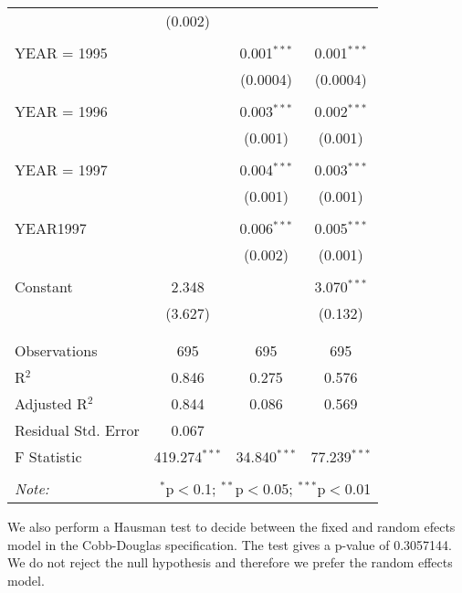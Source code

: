 \documentclass[12pt,a4paper]{article}\usepackage[]{graphicx}\usepackage[]{color}
\begin{document}
\begin{table}[!htbp]
\begin{tabular}{@{\extracolsep{5pt}}lccc}
  & (0.002) &  &  \\ 
  & & & \\ 
 YEAR = 1995 &  & 0.001$^{***}$ & 0.001$^{***}$ \\ 
  &  & (0.0004) & (0.0004) \\ 
  & & & \\ 
 YEAR = 1996 &  & 0.003$^{***}$ & 0.002$^{***}$ \\ 
  &  & (0.001) & (0.001) \\ 
  & & & \\ 
 YEAR = 1997 &  & 0.004$^{***}$ & 0.003$^{***}$ \\ 
  &  & (0.001) & (0.001) \\ 
  & & & \\ 
 YEAR1997 &  & 0.006$^{***}$ & 0.005$^{***}$ \\ 
  &  & (0.002) & (0.001) \\ 
  & & & \\ 
 Constant & 2.348 &  & 3.070$^{***}$ \\ 
  & (3.627) &  & (0.132) \\ 
  & & & \\ 
\hline \\[-1.8ex] 
Observations & 695 & 695 & 695 \\ 
R$^{2}$ & 0.846 & 0.275 & 0.576 \\ 
Adjusted R$^{2}$ & 0.844 & 0.086 & 0.569 \\ 
Residual Std. Error & 0.067 &  &  \\ 
F Statistic & 419.274$^{***}$ & 34.840$^{***}$ & 77.239$^{***}$ \\ 
\hline 
\hline \\[-1.8ex] 
\textit{Note:}  & \multicolumn{3}{r}{$^{*}$p$<$0.1; $^{**}$p$<$0.05; $^{***}$p$<$0.01} \\ 
\end{tabular} 
\end{table} 


We also perform a Hausman test to decide between the fixed and random efects model in the Cobb-Douglas specification. The test gives a p-value of 0.3057144. We do not reject the null hypothesis and therefore we prefer the random effects model.
\end{document}
